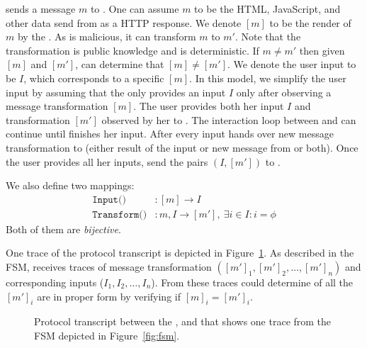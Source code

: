\server sends a message $m$ to \host. One can assume $m$ to be the HTML, JavaScript, and other data send from \server as a HTTP response. We denote $[m]$ to be the render of $m$ by the \host. As \host is malicious, it can transform $m$ to $m'$. Note that the transformation is public knowledge and is deterministic. If $m\neq m'$ then given $[m]$ and $[m']$, \server can determine that $[m]\neq [m']$. We denote the user input to be $I$, which corresponds to a specific $[m]$. 
In this model, we simplify the user input by assuming that the \user only provides an input $I$ only after observing a message transformation $[m]$. The user provides both her input $I$ and transformation $[m']$ observed by her to \host. The interaction loop between \host and \user can continue until \user finishes her input. After every input \host hands over new message transformation to \user (either result of the input or new message from \server or both). Once the user provides all her inputs, \host send the pairs $(I, [m'])$ to \server.

We also define two mappings:
\begin{align*}
\texttt{Input()}&:[m]\rightarrow I \\
\texttt{Transform()}&:m,I\rightarrow [m'],\ \exists i\in I:i=\phi
\end{align*}
Both of them are \emph{bijective}.

One trace of the protocol transcript is depicted in Figure~\ref{fig:protocol}. As described in the FSM, \server receives traces of message transformation $([m']_1,[m']_2,\ldots,[m']_n)$ and corresponding inputs ($I_1,I_2,\ldots,I_n$). From these traces \server could determine of all the $[m']_i$ are in proper form by verifying if $[m]_i=[m']_i$.

\begin{figure}[t]
\begin{center}
\begin{sequencediagram}
\end{sequencediagram}
\end{center}
\caption[\name protocol transcript]{Protocol transcript between the \server, \user and \host that shows one trace from the FSM depicted in Figure~\ref{fig:fsm}.}
\label{fig:protocol}
\end{figure}


